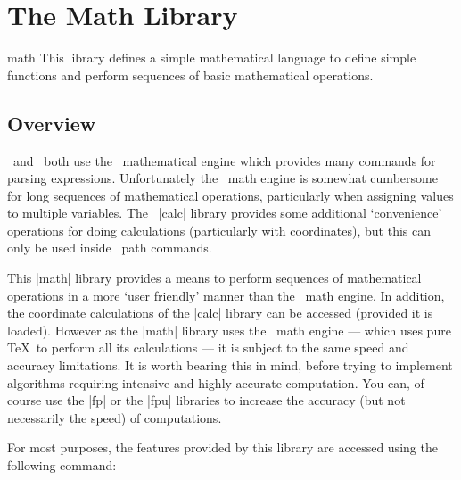 %
%
%



\section{The Math Library}
\label{section-library-math}

\begin{tikzlibrary}{math}
  This library defines a simple mathematical language
  to define simple functions and perform sequences of basic mathematical 
  operations.
\end{tikzlibrary}


\subsection{Overview}

	\pgfname\ and \tikzname\ both use the \pgfname\ mathematical engine
	which provides many commands for parsing expressions. Unfortunately
	the \pgfname\ math engine is somewhat cumbersome for long sequences 
	of mathematical 
	operations, particularly when assigning values to multiple variables.
	The \tikzname\ |calc| library
	provides some additional `convenience' operations for doing calculations
	(particularly with coordinates), but this can only be used inside
	\tikzname\ path commands.
	
	This |math| library provides a means to
	perform sequences of mathematical operations in a more `user friendly'
	manner than the \pgfname\ math engine. In addition, the coordinate calculations of the |calc| library 
	can be accessed (provided it is loaded).
	However as the |math| library uses the \pgfname\ math engine --- which uses pure \TeX\ 
	to perform all its calculations --- it is subject to the same speed
	and accuracy limitations. It is worth bearing this in mind, before 
	trying to implement algorithms requiring intensive and highly
	accurate computation. You can, of course use the |fp| or the |fpu|
	libraries to increase the accuracy (but not necessarily the speed)
	of computations.
	
	For most purposes, the features provided by this library are accessed
	using the following command:
	
